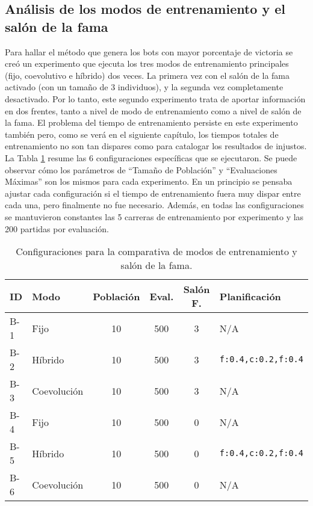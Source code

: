 \subsection{Análisis de los modos de entrenamiento y el salón de la fama} \label{sec:experimentos_modos_entrenamiento}

Para hallar el método que genera los bots con mayor porcentaje de victoria se creó un experimento que ejecuta los tres modos de entrenamiento principales (fijo, coevolutivo e híbrido) dos veces. La primera vez con el salón de la fama activado (con un tamaño de 3 individuos), y la segunda vez completamente desactivado. Por lo tanto, este segundo experimento trata de aportar información en dos frentes, tanto a nivel de modo de entrenamiento como a nivel de salón de la fama. El problema del tiempo de entrenamiento persiste en este experimento también pero, como se verá en el siguiente capítulo, los tiempos totales de entrenamiento no son tan dispares como para catalogar los resultados de injustos. La Tabla \ref{tab:main_experiments} resume las 6 configuraciones específicas que se ejecutaron. Se puede observar cómo los parámetros de ``Tamaño de Población'' y ``Evaluaciones Máximas'' son los mismos para cada experimento. En un principio se pensaba ajustar cada configuración si el tiempo de entrenamiento fuera muy dispar entre cada una, pero finalmente no fue necesario. Además, en todas las configuraciones se mantuvieron constantes las 5 carreras de entrenamiento por experimento y las 200 partidas por evaluación.

\begin{table}[H]
	\centering
	\caption{Configuraciones para la comparativa de modos de entrenamiento y salón de la fama.}
	\label{tab:main_experiments}
	\begin{tabular}{@{}llcccl@{}}
		\toprule
		\textbf{ID} & \textbf{Modo} & \textbf{Población} & \textbf{Eval.} & \textbf{Salón F.} & \textbf{Planificación}      \\ \midrule
		B-1         & Fijo          & 10                 & 500            & 3                 & N/A                        \\
		B-2         & Híbrido       & 10                 & 500            & 3                 & \texttt{f:0.4,c:0.2,f:0.4} \\
		B-3         & Coevolución   & 10                 & 500            & 3                 & N/A                        \\
		\midrule
		B-4         & Fijo          & 10                 & 500            & 0                 & N/A                        \\
		B-5         & Híbrido       & 10                 & 500            & 0                 & \texttt{f:0.4,c:0.2,f:0.4} \\
		B-6         & Coevolución   & 10                 & 500            & 0                 & N/A                        \\ \bottomrule
	\end{tabular}
\end{table}

